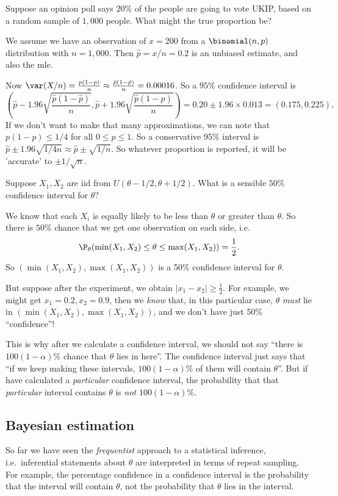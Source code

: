 \documentclass[a4paper]{article}
\begin{document}
\begin{eg}
  Suppose an opinion poll says $20\%$ of the people are going to vote UKIP, based on a random sample of $1,000$ people. What might the true proportion be?

  We assume we have an observation of $x = 200$ from a $\binomial(n, p)$ distribution with $n = 1,000$. Then $\hat p = x/n = 0.2$ is an unbiased estimate, and also the mle.

  Now $\var(X/n) = \frac{p(1 - p)}{n}\approx \frac{\hat p(1 - \hat p)}{n} = 0.00016$. So a $95\%$ confidence interval is
  \[
    \left(\hat p - 1.96\sqrt{\frac{\hat p(1 - \hat p)}{n}}, \hat p + 1.96\sqrt{\frac{\hat p(1 - \hat p)}{n}}\right) = 0.20 \pm 1.96\times 0.013 = (0.175, 0.225),
  \]
  If we don't want to make that many approximations, we can note that $p(1 - p)\leq 1/4$ for all $0 \leq p \leq 1$. So a conservative $95\%$ interval is $\hat p \pm 1.96\sqrt{1/4n} \approx \hat p \pm \sqrt{1/n}$. So whatever proportion is reported, it will be 'accurate' to $\pm 1/\sqrt{n}$.
\end{eg}

\begin{eg}
  Suppose $X_1, X_2$ are iid from $U(\theta - 1/2, \theta + 1/2)$. What is a sensible $50\%$ confidence interval for $\theta$?

  We know that each $X_i$ is equally likely to be less than $\theta$ or greater than $\theta$. So there is $50\%$ chance that we get one observation on each side, i.e.\
  \[
    \P_\theta(\min(X_1, X_2) \leq \theta \leq \max(X_1, X_2)) = \frac{1}{2}.
  \]
  So $(\min(X_1, X_2), \max (X_1, X_2))$ is a 50\% confidence interval for $\theta$.

  But suppose after the experiment, we obtain $|x_1 - x_2| \geq \frac{1}{2}$. For example, we might get $x_1 = 0.2, x_2 = 0.9$, then we \emph{know} that, in this particular case, $\theta$ \emph{must} lie in $(\min (X_1, X_2), \max(X_1, X_2))$, and we don't have just 50\% ``confidence''!

  This is why after we calculate a confidence interval, we should not say ``there is $100(1 - \alpha)\%$ chance that $\theta$ lies in here''. The confidence interval just says that ``if we keep making these intervals, $100(1 - \alpha)\%$ of them will contain $\theta$''. But if have calculated a \emph{particular} confidence interval, the probability that that \emph{particular} interval contains $\theta$ is \emph{not} $100(1 - \alpha)\%$.
\end{eg}

\subsection{Bayesian estimation}
So far we have seen the \emph{frequentist} approach to a statistical inference, i.e.\ inferential statements about $\theta$ are interpreted in terms of repeat sampling. For example, the percentage confidence in a confidence interval is the probability that the interval will contain $\theta$, not the probability that $\theta$ lies in the interval.
\end{document}
